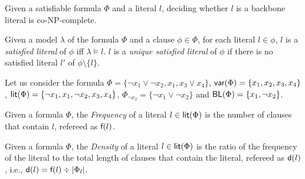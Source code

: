 \begin{theorem}
\label{thm:co-NP}\cite{Jan10}
Given a satisfiable formula $\Phi$ and a literal $l$, deciding whether $l$ is a backbone literal is co-NP-complete.
\end{theorem}


\begin{definition}
Given a model $\lambda$ of the formula $\Phi$ and a clause $\phi\in\Phi$, for each literal $l\in\phi$, $l$ is a \emph{satisfied literal}
of $\phi$ iff $\lambda\models l$. $l$ is a \emph{unique satisfied literal} of $\phi$ if there is no satisfied literal $l'$ of $\phi\setminus\{l\}$.
\end{definition}


Let us consider the formula $\Phi=\{\neg x_1 \vee \neg x_2, x_1, x_3 \vee x_4\}$,
$\textsf{var}(\Phi)=\{x_1, x_2, x_3, x_4\}$, $\textsf{lit}(\Phi)=\{\neg x_1, x_1, \neg x_2, x_3, x_4\}$, $\Phi_{\neg x_2}=\{\neg x_1 \vee \neg x_2\}$ and $\textsf{BL}(\Phi)=\{x_1, \neg x_2\}$.


\begin{definition}
Given a formula $\Phi$, the \emph{Frequency} of a literal $l\in\textsf{lit}(\Phi)$ is the number of clauses that contain $l$, refereed as $\textsf{f}(l)$.
\end{definition}

\begin{definition}
Given a formula $\Phi$, the \emph{Density} of a literal $l\in\textsf{lit}(\Phi)$ is the ratio of the frequency of the literal to the total length of clauses that contain the literal, refereed as $\textsf{d}(l)$, i.e., $\textsf{d}(l)=\textsf{f}(l)\div|\Phi_l|$.
\end{definition}
